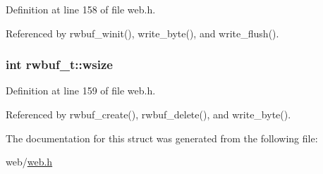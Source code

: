 Definition at line 158 of file web.\-h.



Referenced by rwbuf\-\_\-winit(), write\-\_\-byte(), and write\-\_\-flush().

\hypertarget{structrwbuf__t_ac723cf150dd35d0f67ba7d38b18863ad}{
\subsubsection[{wsize}]{\setlength{\rightskip}{0pt plus 5cm}int rwbuf\-\_\-t\-::wsize}}\label{structrwbuf__t_ac723cf150dd35d0f67ba7d38b18863ad}


Definition at line 159 of file web.\-h.



Referenced by rwbuf\-\_\-create(), rwbuf\-\_\-delete(), and write\-\_\-byte().



The documentation for this struct was generated from the following file\-:\begin{DoxyCompactItemize}
\item 
web/\hyperlink{web_8h}{web.\-h}\end{DoxyCompactItemize}
